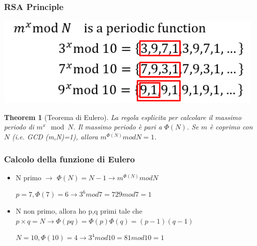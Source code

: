 \documentclass{book}
\newtheorem{theorem}{Theorem}[section]
\theoremstyle{remark}
\begin{document}
\subsubsection{RSA Principle}
\begin{center}
	\includegraphics[scale=0.6]{2021-12-04-16-42-43.png}
\end{center}
\begin{theorem}[Teorema di Eulero]
	La regola esplicita per calcolare il massimo periodo di \(m^x \mod{N}\)\@. Il massimo periodo è pari a \(\Phi(N)\)\@. \newline Se \(m\) è coprimo con \(N\) (i\@.e\@. GCD (m,N)=1), allora \(m^{\Phi(N)} mod N = 1\)\@.
\end{theorem}
\subsubsection{Calcolo della funzione di Eulero}
\begin{itemize}
	\item N primo \(\rightarrow\) \(\Phi(N)=N-1\rightarrow m^{\Phi(N)}mod N\)
	      \begin{center}
		      \(p=7,\Phi(7)=6\rightarrow 3^6 mod 7=729 mod 7=1\)
	      \end{center}
	\item N non primo, allora ho p,q primi tale che \(p\times q=N\rightarrow \Phi(pq)=\Phi(p)\Phi(q)=(p-1)(q-1)\)
	      \begin{center}
		      \(N=10,\Phi(10)=4\rightarrow 3^4 mod 10 = 81 mod 10 = 1\)
	      \end{center}
\end{itemize}
\end{document}
